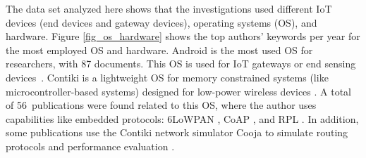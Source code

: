 \documentclass[symmetry,article,accept,moreauthors,pdftex10pt,a4paper]{mdpi}
\begin{document}
The data set analyzed here shows that the investigations used different IoT devices (end devices and gateway devices), operating systems (OS), and hardware. Figure \ref{fig_os_hardware} shows the top authors' keywords per year for the most employed OS and hardware. Android is the most used OS for researchers, with 87 documents. This OS is used for IoT gateways \cite{Chen2015218,Bian2011526,Carlson2013619,Garcia201654} or end sensing devices~\mbox{\cite{Prakash2016,Sutar201673,Hossain20155095}}. Contiki is a lightweight OS for memory constrained systems (like microcontroller-based systems) designed for low-power wireless devices \cite{1367266}. A total of 56~publications were found related to this OS, where the author uses capabilities like embedded protocols: 6LoWPAN \cite{Bragg20161273,Anjana2016}, CoAP \cite{Yassein2016160}, and RPL \cite{Gonizzi20131400}. In addition, some publications use the Contiki network simulator Cooja to simulate routing protocols \cite{Banh2016206} and performance evaluation \cite{Sitanayah2013}.
\end{document}

